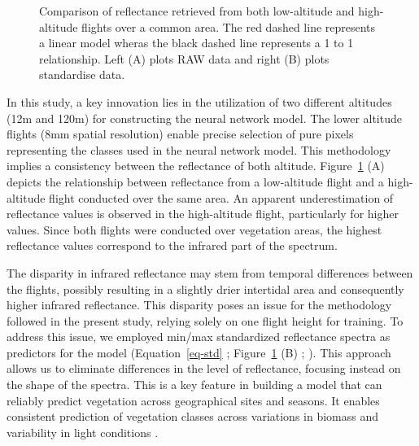 \documentclass[
  number]{elsarticle}
\begin{document}
\label{cell-fig-CompareRef}
\begin{figure}[H]


\caption{\label{fig-CompareRef}Comparison of reflectance retrieved from
both low-altitude and high-altitude flights over a common area. The red
dashed line represents a linear model wheras the black dashed line
represents a 1 to 1 relationship. Left (A) plots RAW data and right (B)
plots standardise data.}

\end{figure}%

In this study, a key innovation lies in the utilization of two different
altitudes (12m and 120m) for constructing the neural network model. The
lower altitude flights (8mm spatial resolution) enable precise selection
of pure pixels representing the classes used in the neural network
model. This methodology implies a consistency between the reflectance of
both altitude. Figure~\ref{fig-CompareRef} (A) depicts the relationship
between reflectance from a low-altitude flight and a high-altitude
flight conducted over the same area. An apparent underestimation of
reflectance values is observed in the high-altitude flight, particularly
for higher values. Since both flights were conducted over vegetation
areas, the highest reflectance values correspond to the infrared part of
the spectrum.

The disparity in infrared reflectance may stem from temporal differences
between the flights, possibly resulting in a slightly drier intertidal
area and consequently higher infrared reflectance. This disparity poses
an issue for the methodology followed in the present study, relying
solely on one flight height for training. To address this issue, we
employed min/max standardized reflectance spectra as predictors for the
model (Equation~\ref{eq-std} ; Figure~\ref{fig-CompareRef} (B) ;
\citep{Cao2017}). This approach allows us to eliminate differences in
the level of reflectance, focusing instead on the shape of the spectra.
This is a key feature in building a model that can reliably predict
vegetation across geographical sites and seasons. It enables consistent
prediction of vegetation classes across variations in biomass and
variability in light conditions \citetext{\citealp[
]{fyfe2003spatial}; \citealp[
]{COSTA2021107018}; \citealp{piaser2023impact}}.
\end{document}
